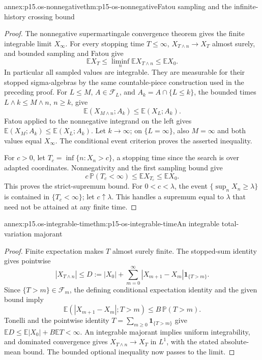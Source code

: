 \begin{annexitem}{annex:p15.os-nonnegative}{thm:p15-os-nonnegative}{Fatou sampling and the infinite-history crossing bound}
\begin{proof}
The nonnegative supermartingale convergence theorem gives
the finite integrable limit \(X_\infty\).
For every stopping time \(T\leq\infty\),
\(X_{T\wedge n}\to X_T\) almost surely, and bounded sampling
and Fatou give
\[
 \mathbb EX_T\leq\liminf_n\mathbb EX_{T\wedge n}
                                               \leq\mathbb EX_0.
 \]
In particular all sampled values are integrable.
They are measurable for their stopped sigma-algebras by the
same countable-piece construction used in the preceding proof.
For \(L\leq M\), \(A\in\mathcal F_L\), and
\(A_k=A\cap\{L\leq k\}\), the bounded times
\(L\wedge k\leq M\wedge n\), \(n\geq k\), give
\[
 \mathbb E(X_{M\wedge n};A_k)\leq\mathbb E(X_L;A_k).
 \]
Fatou applied to the nonnegative integrand on the left gives
\(\mathbb E(X_M;A_k)\leq\mathbb E(X_L;A_k)\).
Let \(k\to\infty\); on \(\{L=\infty\}\), also \(M=\infty\)
and both values equal \(X_\infty\).
The conditional event criterion proves the asserted inequality.

For \(c>0\), let \(T_c=\inf\{n:X_n>c\}\), a stopping time
since the search is over adapted coordinates.
Nonnegativity and the first sampling bound give
\[
 c\,\mathbb P(T_c<\infty)\leq\mathbb EX_{T_c}\leq\mathbb EX_0.
 \]
This proves the strict-supremum bound.
For \(0<c<\lambda\), the event \(\{\sup_nX_n\geq\lambda\}\)
is contained in \(\{T_c<\infty\}\); let \(c\uparrow\lambda\).
This handles a supremum equal to \(\lambda\) that need not
be attained at any finite time.
\end{proof}
\end{annexitem}

\begin{annexitem}{annex:p15.os-integrable-time}{thm:p15-os-integrable-time}{An integrable total-variation majorant}
\begin{proof}
Finite expectation makes \(T\) almost surely finite.
The stopped-sum identity gives pointwise
\[
 |X_{T\wedge n}|
 \leq D:=|X_0|+
         \sum_{m=0}^\infty|X_{m+1}-X_m|\mathbf1_{\{T>m\}}.
 \]
Since \(\{T>m\}\in\mathcal F_m\), the defining conditional
expectation identity and the given bound imply
\[
 \mathbb E(|X_{m+1}-X_m|;T>m)\leq B\,\mathbb P(T>m).
 \]
Tonelli and the pointwise identity
\(T=\sum_{m\geq0}\mathbf1_{\{T>m\}}\) give
\(\mathbb ED\leq\mathbb E|X_0|+B\mathbb ET<\infty\).
An integrable majorant implies uniform integrability, and
dominated convergence gives \(X_{T\wedge n}\to X_T\)
in \(L^1\), with the stated absolute-mean bound.
The bounded optional inequality now passes to the limit.
\end{proof}
\end{annexitem}

